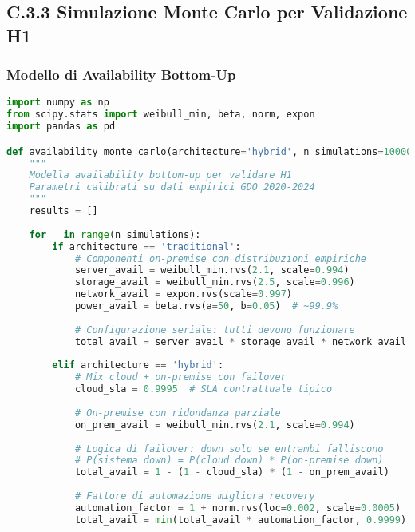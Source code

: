 
\subsection{C.3.3 Simulazione Monte Carlo per Validazione H1}

\subsubsection{Modello di Availability Bottom-Up}

\begin{lstlisting}[language=Python, caption=Modellazione Availability per Architetture Ibride]
import numpy as np
from scipy.stats import weibull_min, beta, norm, expon
import pandas as pd

def availability_monte_carlo(architecture='hybrid', n_simulations=10000):
    """
    Modella availability bottom-up per validare H1
    Parametri calibrati su dati empirici GDO 2020-2024
    """
    results = []
    
    for _ in range(n_simulations):
        if architecture == 'traditional':
            # Componenti on-premise con distribuzioni empiriche
            server_avail = weibull_min.rvs(2.1, scale=0.994)
            storage_avail = weibull_min.rvs(2.5, scale=0.996)
            network_avail = expon.rvs(scale=0.997)
            power_avail = beta.rvs(a=50, b=0.05)  # ~99.9%
            
            # Configurazione seriale: tutti devono funzionare
            total_avail = server_avail * storage_avail * network_avail * power_avail
            
        elif architecture == 'hybrid':
            # Mix cloud + on-premise con failover
            cloud_sla = 0.9995  # SLA contrattuale tipico
            
            # On-premise con ridondanza parziale
            on_prem_avail = weibull_min.rvs(2.1, scale=0.994)
            
            # Logica di failover: down solo se entrambi falliscono
            # P(sistema down) = P(cloud down) * P(on-premise down)
            total_avail = 1 - (1 - cloud_sla) * (1 - on_prem_avail)
            
            # Fattore di automazione migliora recovery
            automation_factor = 1 + norm.rvs(loc=0.002, scale=0.0005)
            total_avail = min(total_avail * automation_factor, 0.9999)
            

\end{lstlisting}
